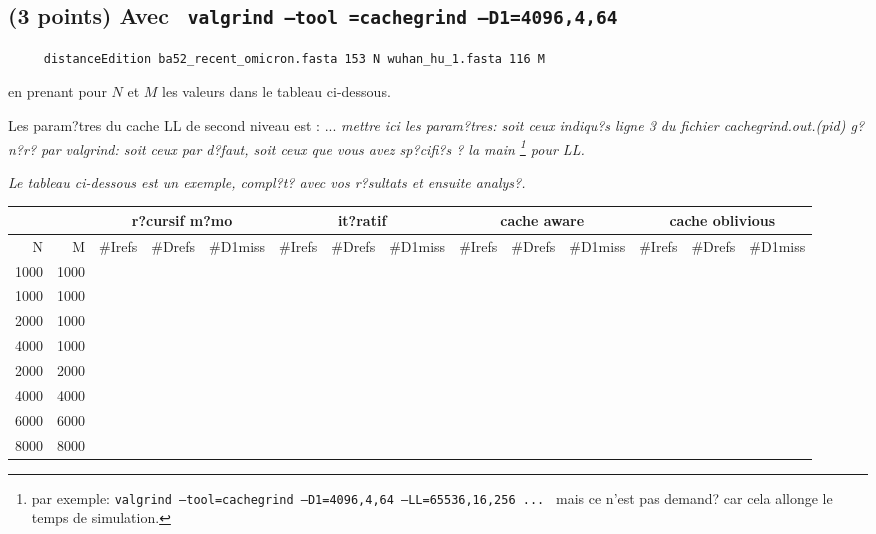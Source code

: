 \documentclass[10pt,a4paper]{article}
\begin{document}
\subsection{(3 points) Avec {\tt 
	valgrind --tool =cachegrind --D1=4096,4,64
}} 
\begin{verbatim}
     distanceEdition ba52_recent_omicron.fasta 153 N wuhan_hu_1.fasta 116 M 
\end{verbatim}
en prenant pour $N$ et $M$ les valeurs dans le tableau ci-dessous.


Les param?tres du cache LL de second niveau est : ...
{\em mettre ici les param?tres: soit ceux indiqu?s ligne 3
du fichier cachegrind.out.(pid) g?n?r? par valgrind: soit ceux par d?faut,
soit ceux que vous avez sp?cifi?s ? la main
\footnote{par exemple:
{\tt valgrind --tool=cachegrind --D1=4096,4,64 --LL=65536,16,256  ... }
mais ce n'est pas demand? car cela allonge le temps de simulation. } 
 pour LL. }

{\em Le tableau ci-dessous est un exemple,  compl?t? avec vos r?sultats et 
ensuite analys?.}
\\
{\footnotesize
\begin{tabular}{|r|r||r|r|r||r|r|r||r|r|r||r|r|r||}
\hline
 \multicolumn{2}{|c||}{ } 
& \multicolumn{3}{c||}{r?cursif m?mo}
& \multicolumn{3}{c||}{it?ratif}
& \multicolumn{3}{c||}{cache aware}
& \multicolumn{3}{c||}{cache oblivious}
\\ \hline
N & M 
& \#Irefs & \#Drefs & \#D1miss %
& \#Irefs & \#Drefs & \#D1miss %
& \#Irefs & \#Drefs & \#D1miss %
& \#Irefs & \#Drefs & \#D1miss %
\\ \hline
\hline
1000 & 1000 
&  &  &   %
&  &  &   %
&  &  &   %
&  &  &   %
\\ \hline
1000 & 1000 
&  &  &   %
&  &  &   %
&  &  &   %
&  &  &   %
\\ \hline
2000 & 1000 
&  &  &   %
&  &  &   %
&  &  &   %
&  &  &   %
\\ \hline
4000 & 1000 
&  &  &   %
&  &  &   %
&  &  &   %
&  &  &   %
\\ \hline
2000 & 2000 
&  &  &   %
&  &  &   %
&  &  &   %
&  &  &   %
\\ \hline
4000 & 4000 
&  &  &   %
&  &  &   %
&  &  &   %
&  &  &   %
\\ \hline
6000 & 6000 
&  &  &   %
&  &  &   %
&  &  &   %
&  &  &   %
\\ \hline
8000 & 8000 
&  &  &   %
&  &  &   %
&  &  &   %
&  &  &   %
\\ \hline
\hline
\end{tabular}
}
\end{document}
